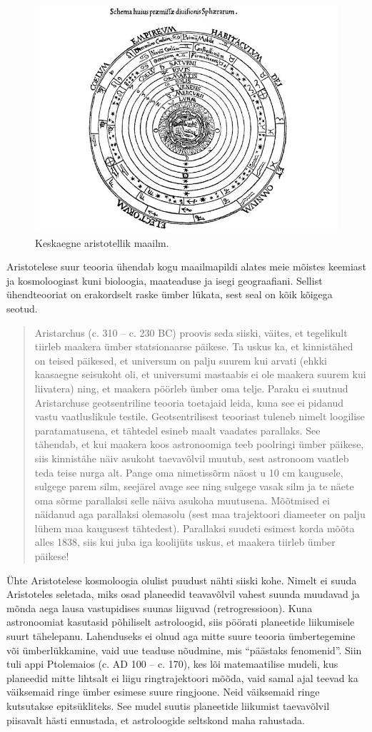 \documentclass[]{book}
\begin{document}
\begin{figure}
\includegraphics[width=0.5\linewidth]{img/arist} \caption{Keskaegne aristotellik maailm.}\label{fig:unnamed-chunk-2}
\end{figure}

Aristotelese suur teooria ühendab kogu maailmapildi alates meie mõistes
keemiast ja kosmoloogiast kuni bioloogia, maateaduse ja isegi
geograafiani. Sellist ühendteooriat on erakordselt raske ümber lükata,
sest seal on kõik kõigega seotud.

\begin{quote}
Aristarchus (c. 310 -- c. 230 BC) proovis seda siiski, väites, et
tegelikult tiirleb maakera ümber statsionaarse päikese. Ta uskus ka, et
kinnistähed on teised päikesed, et universum on palju suurem kui arvati
(ehkki kaasaegne seisukoht oli, et universumi mastaabis ei ole maakera
suurem kui liivatera) ning, et maakera pöörleb ümber oma telje. Paraku
ei suutnud Aristarchuse geotsentriline teooria toetajaid leida, kuna see
ei pidanud vastu vaatluslikule testile. Geotsentrilisest teooriast
tuleneb nimelt loogilise paratamatusena, et tähtedel esineb maalt
vaadates parallaks. See tähendab, et kui maakera koos astronoomiga teeb
poolringi ümber päikese, siis kinnistähe näiv asukoht taevavõlvil
muutub, sest astronoom vaatleb teda teise nurga alt. Pange oma
nimetissõrm näost u 10 cm kaugusele, sulgege parem silm, seejärel avage
see ning sulgege vasak silm ja te näete oma sõrme parallaksi selle näiva
asukoha muutusena. Mõõtmised ei näidanud aga parallaksi olemasolu (sest
maa trajektoori diameeter on palju lühem maa kaugusest tähtedest).
Parallaksi suudeti esimest korda mõõta alles 1838, siis kui juba iga
koolijüts uskus, et maakera tiirleb ümber päikese!
\end{quote}

Ühte Aristotelese kosmoloogia olulist puudust nähti siiski kohe. Nimelt
ei suuda Aristoteles seletada, miks osad planeedid teavavõlvil vahest
suunda muudavad ja mõnda aega lausa vastupidises suunas liiguvad
(retrogressioon). Kuna astronoomiat kasutasid põhiliselt astroloogid,
siis pöörati planeetide liikumisele suurt tähelepanu. Lahenduseks ei
olnud aga mitte suure teooria ümbertegemine või ümberlükkamine, vaid uue
teaduse nõudmine, mis ``päästaks fenomenid''. Siin tuli appi Ptolemaios
(c. AD 100 -- c. 170), kes lõi matemaatilise mudeli, kus planeedid mitte
lihtsalt ei liigu ringtrajektoori mõõda, vaid samal ajal teevad ka
väiksemaid ringe ümber esimese suure ringjoone. Neid väiksemaid ringe
kutsutakse epitsükliteks. See mudel suutis planeetide liikumist
taevavõlvil piisavalt hästi ennustada, et astroloogide seltskond maha
rahustada.
\end{document}
